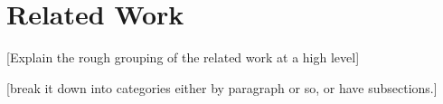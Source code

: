 \section{Related Work}
\label{SEC:related-work}

[Explain the rough grouping of the related work at a high level]

[break it down into categories either by paragraph or so, or have subsections.]
